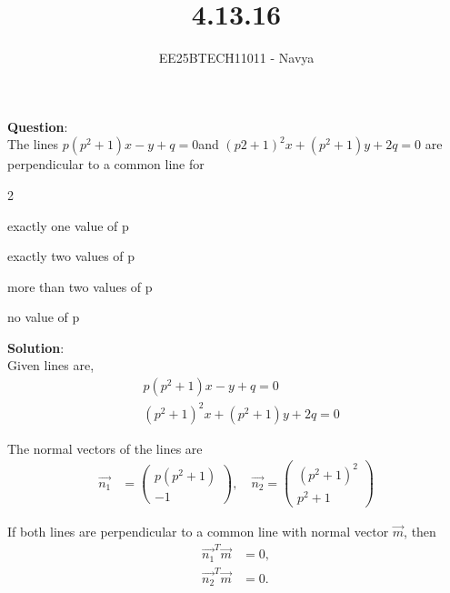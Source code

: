 \documentclass[journal]{IEEEtran}
\begin{document}

\vspace{3cm}

\title{4.13.16}
\author{EE25BTECH11011 - Navya}
{\let\newpage\relax\maketitle}

\renewcommand{\thefigure}{\theenumi}
\renewcommand{\thetable}{\theenumi}
\setlength{\intextsep}{10pt} %
\textbf{Question}:\\
The lines $p(p^2+1)x - y+q=0$and $(p2+1)^2 x+(p^2+1) y+2q=0$ are perpendicular to a common line for
\begin{enumerate}
\begin{multicols}{2}
    \item exactly one value of p
    \item exactly two values of p
    \item more than two values of p 
    \item no value of p
\end{multicols}
\end{enumerate}

\textbf{Solution}:\\
Given lines are,
\begin{align}
& p(p^2+1)x - y + q = 0  \\
& (p^2+1)^2 x + (p^2+1)y + 2q = 0
\end{align}

The normal vectors of the lines are
\begin{align}
\vec{n_1} &= \begin{pmatrix} p(p^2+1)\\ -1 \end{pmatrix}, \quad
\vec{n_2} = \begin{pmatrix} (p^2+1)^2 \\ p^2+1 \end{pmatrix}
\end{align}

If both lines are perpendicular to a common line with normal vector $\vec{m}$, then
\begin{align}
\vec{n_1}^T \vec{m} &= 0, \\
\vec{n_2}^T \vec{m} &= 0.
\end{align}
\end{document}
